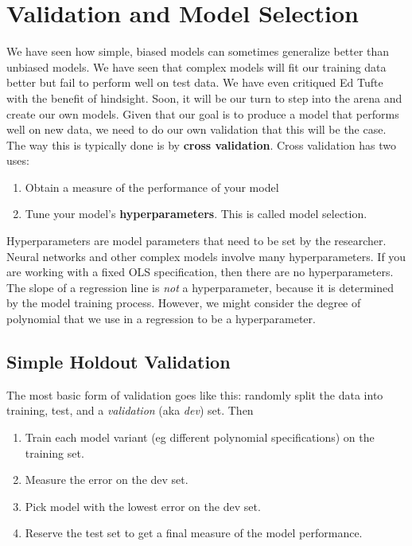 \section{Validation and Model Selection}

We have seen how simple, biased models can sometimes generalize better than unbiased models. We have seen that complex models will fit our training data better but fail to perform well on test data. We have even critiqued Ed Tufte with the benefit of hindsight. Soon, it will be our turn to step into the arena and create our own models. Given that our goal is to produce a model that performs well on new data, we need to do our own validation that this will be the case. The way this is typically done is by \textbf{cross validation}. Cross validation has two uses:

\begin{enumerate}
\item Obtain a measure of the performance of your model
\item Tune your model's \textbf{hyperparameters}. This is called model selection.
\end{enumerate}

Hyperparameters are model parameters that need to be set by the researcher. Neural networks and other complex models involve many hyperparameters. If you are working with a fixed OLS specification, then there are no hyperparameters. The slope of a regression line is \textit{not} a hyperparameter, because it is determined by the model training process. However, we might consider the degree of polynomial that we use in a regression to be a hyperparameter.

\subsection{Simple Holdout Validation}

The most basic form of validation goes like this: randomly split the data into training, test, and a \textit{validation} (aka \textit{dev}) set. Then

\begin{enumerate}
\item Train each model variant (eg different polynomial specifications) on the training set.
\item Measure the error on the dev set.
\item Pick model with the lowest error on the dev set.
\item Reserve the test set to get a final measure of the model performance.
\end{enumerate}

